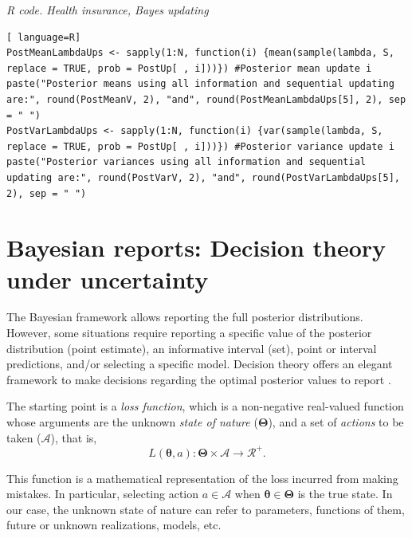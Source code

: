 \begin{tcolorbox}[enhanced,width=4.67in,center upper,
	fontupper=\large\bfseries,drop shadow southwest,sharp corners]
	\textit{R code. Health insurance, Bayes updating}
	\begin{VF}
		\begin{lstlisting}[ language=R]
PostMeanLambdaUps <- sapply(1:N, function(i) {mean(sample(lambda, S, replace = TRUE, prob = PostUp[ , i]))}) #Posterior mean update i
paste("Posterior means using all information and sequential updating are:", round(PostMeanV, 2), "and", round(PostMeanLambdaUps[5], 2), sep = " ")
PostVarLambdaUps <- sapply(1:N, function(i) {var(sample(lambda, S, replace = TRUE, prob = PostUp[ , i]))}) #Posterior variance update i
paste("Posterior variances using all information and sequential updating are:", round(PostVarV, 2), "and", round(PostVarLambdaUps[5], 2), sep = " ")
\end{lstlisting}
	\end{VF}
\end{tcolorbox}


\section{Bayesian reports: Decision theory under uncertainty}\label{sec14}

The Bayesian framework allows reporting the full posterior distributions. However, some situations require reporting a specific value of the posterior distribution (point estimate), an informative interval (set), point or interval predictions, and/or selecting a specific model. Decision theory offers an elegant framework to make decisions regarding the optimal posterior values to report \cite{berger2013statistical}.

The starting point is a \textit{loss function}, which is a non-negative real-valued function whose arguments are the unknown \textit{state of nature} ($\mathbf{\Theta}$), and a set of \textit{actions} to be taken ($\mathcal{A}$), that is, 
\begin{equation*}
	L(\bm{\theta}, a):\mathbf{\Theta}\times \mathcal{A}\rightarrow \mathcal{R}^+.
\end{equation*}

This function is a mathematical representation of the loss incurred from making mistakes. In particular, selecting action $a\in\mathcal{A}$ when $\bm{\theta}\in\mathbf{\Theta}$ is the true state. In our case, the unknown state of nature can refer to parameters, functions of them, future or unknown realizations, models, etc.

